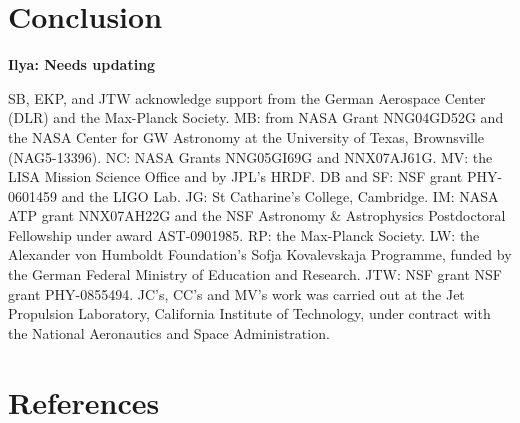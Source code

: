 \documentclass{iopart}
\newcommand{\ilya}[1]{{\color{red} \bf Ilya: #1}}
\begin{document}
\section{Conclusion}

\ack

\ilya{Needs updating}

SB, EKP, and JTW acknowledge support from the German Aerospace Center (DLR) and the Max-Planck Society.
MB: from NASA Grant NNG04GD52G and the NASA Center for GW Astronomy at the University of Texas, Brownsville (NAG5-13396). 
NC: NASA Grants NNG05GI69G and NNX07AJ61G.
MV: the LISA Mission Science Office and by JPL's HRDF.
DB and SF: NSF grant PHY-0601459 and the LIGO Lab.
JG: St Catharine's College, Cambridge.
IM: NASA ATP grant NNX07AH22G and the NSF Astronomy \& Astrophysics Postdoctoral Fellowship under award AST-0901985.
RP: the Max-Planck Society.
LW: the Alexander von Humboldt Foundation's Sofja Kovalevskaja Programme, funded by the German Federal Ministry of Education and Research.
JTW: NSF grant NSF grant PHY-0855494.
JC's, CC's and MV's work was carried out at the Jet Propulsion Laboratory, California Institute of Technology, under contract with the National Aeronautics and Space Administration.

\section*{References}
\end{document}
